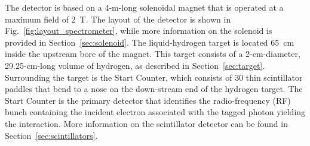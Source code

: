 The \gx{} detector is based on a 4-m-long solenoidal magnet that is operated at a maximum field of 2~T. The layout of the detector is shown in Fig.~\ref{fig:layout_spectrometer}, while more information on the solenoid is provided in Section~\ref{sec:solenoid}. The liquid-hydrogen target is located 65~cm inside the upstream bore of the magnet. This target consists of a 2-cm-diameter, 29.25-cm-long volume of hydrogen, as described in Section~\ref{sec:target}. Surrounding the target is the Start Counter, which consists of 30 thin scintillator paddles that bend to a nose on the down-stream end of the hydrogen target. The Start Counter is the primary detector that identifies the radio-frequency (RF) bunch containing the incident electron associated with the tagged photon yielding the interaction. More information on the scintillator detector can be found in Section~\ref{sec:scintillators}. 


